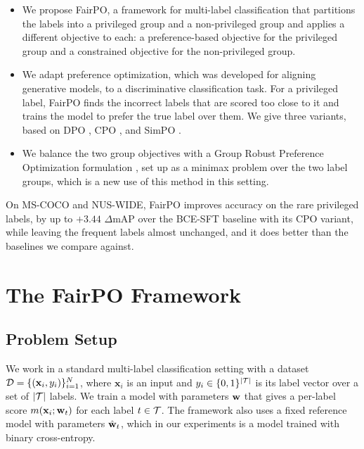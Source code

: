 \begin{itemize}
	\item We propose FairPO, a framework for multi-label classification that
	partitions the labels into a privileged group and a non-privileged group and
	applies a different objective to each: a preference-based objective for the
	privileged group and a constrained objective for the non-privileged group.
	
	\item We adapt preference optimization, which was developed for aligning
	generative models, to a discriminative classification task. For a privileged
	label, FairPO finds the incorrect labels that are scored too close to it and
	trains the model to prefer the true label over them. We give three variants,
	based on DPO \citep{rafailov2023direct}, CPO \citep{xu2024contrastive}, and SimPO
	\citep{meng2024simpo}.
	
	\item We balance the two group objectives with a Group Robust Preference
	Optimization formulation \citep{ramesh2024group}, set up as a minimax problem
	over the two label groups, which is a new use of this method in this setting.
\end{itemize}

On MS-COCO and NUS-WIDE, FairPO improves accuracy on the rare privileged labels, by
up to $+3.44$ $\Delta\text{mAP}$ over the BCE-SFT baseline with its CPO variant,
while leaving the frequent labels almost unchanged, and it does better than the
baselines we compare against.

\section{The FairPO Framework}
\label{sec:fairpo-framework}

\subsection{Problem Setup}
\label{subsec:fairpo-setup}

We work in a standard multi-label classification setting with a dataset
$\mathcal{D} = \{ (\mathbf{x}_i, y_i) \}_{i=1}^N$, where $\mathbf{x}_i$ is an input and
$y_i \in \{0, 1\}^{|\mathcal{T}|}$ is its label vector over a set of $|\mathcal{T}|$
labels. We train a model with parameters $\mathbf{w}$ that gives a per-label score
$m(\mathbf{x}_i; \mathbf{w}_t)$ for each label $t \in \mathcal{T}$. The framework
also uses a fixed reference model with parameters $\hat{\mathbf{w}}_t$, which in our
experiments is a model trained with binary cross-entropy.

